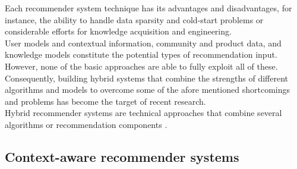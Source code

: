 Each recommender system technique has its advantages and disadvantages, 
for instance, the ability to handle data sparsity and cold-start problems
or considerable efforts for knowledge acquisition and engineering. \\
User models and contextual information, community and product data,
and knowledge models constitute the potential types of recommendation
input. However, none of the basic approaches are able to fully exploit
all of these. \\ Consequently, building hybrid systems that combine the
strengths of different algorithms and models to overcome some of the
afore mentioned shortcomings and problems has become the target of
recent research. \\ Hybrid recommender systems are technical approaches
that combine several algorithms or recommendation 
components \cite{jannach2010recommender}.

\subsection{Context-aware recommender systems}

